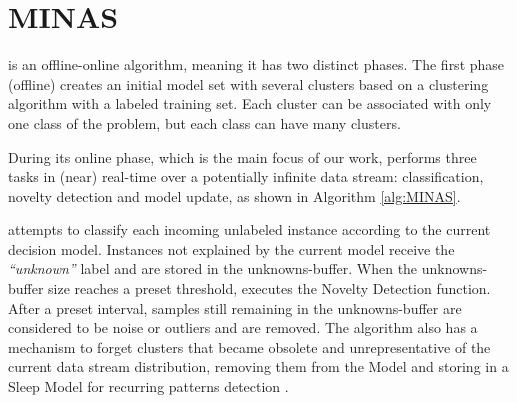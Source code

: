 
\section{MINAS}
\label{sec:minas}


\minas \cite{Faria2013Minas,Faria2016minas} is an offline-online \nd algorithm,
meaning it has two distinct phases. The first phase (offline) creates an initial
model set with several clusters based on a clustering algorithm with a labeled
training set.
Each cluster can be associated with only one class of the problem, but each
class can have many clusters.

During its online phase, which is the main focus of our work, \minas performs
three tasks in (near) real-time over a potentially infinite data stream:
classification, novelty detection and model update,
as shown in Algorithm \ref{alg:MINAS}.

\minas attempts to classify each incoming unlabeled instance according to the
current decision model. Instances not explained by the current model
receive the \textit{``unknown''} label and are stored in the unknowns-buffer.
When the unknowns-buffer size reaches a preset threshold, \minas executes the
Novelty Detection function.
After a preset interval, samples still remaining in the unknowns-buffer are considered to be
noise or outliers and are removed.
The algorithm also has a mechanism to forget clusters that became obsolete and
unrepresentative of the current data stream distribution, removing them from
the Model and storing in a Sleep Model for recurring patterns
detection \cite{Faria2016minas}.

